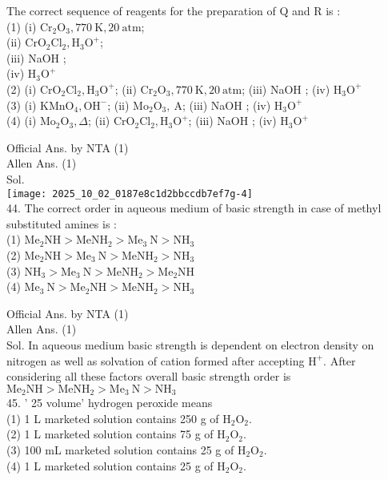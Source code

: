 \documentclass[10pt]{article}
\begin{document}
The correct sequence of reagents for the preparation of Q and R is :\\
(1) (i) \(\mathrm{Cr}_{2} \mathrm{O}_{3}, 770 \mathrm{~K}, 20 \mathrm{~atm}\);\\
(ii) \(\mathrm{CrO}_{2} \mathrm{Cl}_{2}, \mathrm{H}_{3} \mathrm{O}^{+}\);\\
(iii) NaOH ;\\
(iv) \(\mathrm{H}_{3} \mathrm{O}^{+}\)\\
(2) (i) \(\mathrm{CrO}_{2} \mathrm{Cl}_{2}, \mathrm{H}_{3} \mathrm{O}^{+}\); (ii) \(\mathrm{Cr}_{2} \mathrm{O}_{3}, 770 \mathrm{~K}, 20 \mathrm{~atm}\); (iii) NaOH ; (iv) \(\mathrm{H}_{3} \mathrm{O}^{+}\)\\
(3) (i) \(\mathrm{KMnO}_{4}, \mathrm{OH}^{-}\); (ii) \(\mathrm{Mo}_{2} \mathrm{O}_{3}, \mathrm{~A}\); (iii) NaOH ; (iv) \(\mathrm{H}_{3} \mathrm{O}^{+}\)\\
(4) (i) \(\mathrm{Mo}_{2} \mathrm{O}_{3}, \Delta\); (ii) \(\mathrm{CrO}_{2} \mathrm{Cl}_{2}, \mathrm{H}_{3} \mathrm{O}^{+}\); (iii) NaOH ; (iv) \(\mathrm{H}_{3} \mathrm{O}^{+}\)

Official Ans. by NTA (1)\\
Allen Ans. (1)\\
Sol.\\
\texttt{[image: 2025\_10\_02\_0187e8c1d2bbccdb7ef7g-4]}\\
44. The correct order in aqueous medium of basic strength in case of methyl substituted amines is :\\
(1) \(\mathrm{Me}_{2} \mathrm{NH}>\mathrm{MeNH}_{2}>\mathrm{Me}_{3} \mathrm{~N}>\mathrm{NH}_{3}\)\\
(2) \(\mathrm{Me}_{2} \mathrm{NH}>\mathrm{Me}_{3} \mathrm{~N}>\mathrm{MeNH}_{2}>\mathrm{NH}_{3}\)\\
(3) \(\mathrm{NH}_{3}>\mathrm{Me}_{3} \mathrm{~N}>\mathrm{MeNH}_{2}>\mathrm{Me}_{2} \mathrm{NH}\)\\
(4) \(\mathrm{Me}_{3} \mathrm{~N}>\mathrm{Me}_{2} \mathrm{NH}>\mathrm{MeNH}_{2}>\mathrm{NH}_{3}\)

Official Ans. by NTA (1)\\
Allen Ans. (1)\\
Sol. In aqueous medium basic strength is dependent on electron density on nitrogen as well as solvation of cation formed after accepting \(\mathrm{H}^{+}\). After considering all these factors overall basic strength order is\\
\(\mathrm{Me}_{2} \mathrm{NH}>\mathrm{MeNH}_{2}>\mathrm{Me}_{3} \mathrm{~N}>\mathrm{NH}_{3}\)\\
45. ' 25 volume' hydrogen peroxide means\\
(1) 1 L marketed solution contains 250 g of \(\mathrm{H}_{2} \mathrm{O}_{2}\).\\
(2) 1 L marketed solution contains 75 g of \(\mathrm{H}_{2} \mathrm{O}_{2}\).\\
(3) 100 mL marketed solution contains 25 g of \(\mathrm{H}_{2} \mathrm{O}_{2}\).\\
(4) 1 L marketed solution contains 25 g of \(\mathrm{H}_{2} \mathrm{O}_{2}\).
\end{document}
